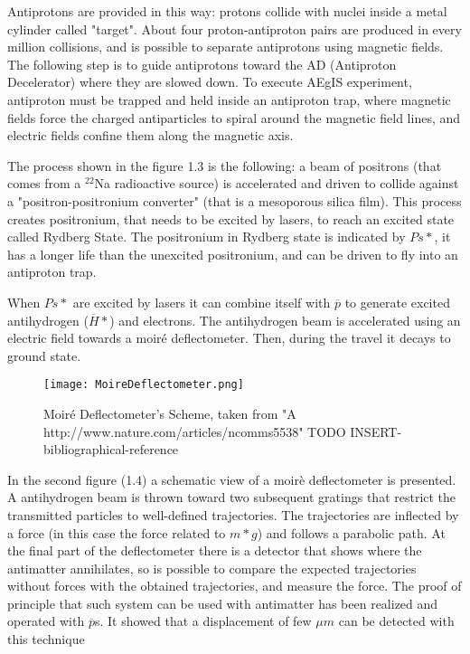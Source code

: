 Antiprotons are provided in this way:
protons collide with nuclei inside a metal cylinder called "target". About four proton-antiproton pairs are produced in every million collisions, and is possible to separate antiprotons using magnetic fields. The following step is to guide antiprotons toward the AD (Antiproton Decelerator) where they are slowed down. To execute AEgIS experiment, antiproton must be trapped and held inside an antiproton trap, where magnetic fields force the charged antiparticles to spiral around the magnetic field lines, and electric fields confine them along the magnetic axis.

The process shown in the figure 1.3 is the following: a beam of positrons (that comes from a $^{22}$Na radioactive source) is accelerated and driven to collide against a "positron-positronium converter" (that is a mesoporous silica film). This process creates positronium, that needs to be excited by lasers, to reach an excited state called Rydberg State. The positronium in Rydberg state is indicated by $ {Ps*} $, it has a longer life than the unexcited positronium, and can be driven to fly into an antiproton trap.


When $ {Ps*} $ are excited by lasers it can combine itself with $ \overline{p} $ to generate excited antihydrogen ($ \overline{H}* $) and electrons. The antihydrogen beam is accelerated using an electric field towards a moiré deflectometer. Then, during the travel it decays to ground state.  


\begin{figure}[H]
\centering
\texttt{[image: MoireDeflectometer.png]} 
\caption{Moiré Deflectometer's Scheme, taken from "A
http://www.nature.com/articles/ncomms5538" TODO INSERT-bibliographical-reference}
\end{figure}

In the second figure (1.4) a schematic view of a moirè deflectometer is presented.
A antihydrogen beam is thrown toward two subsequent gratings that restrict the transmitted particles to well-defined trajectories. The trajectories are inflected by a force (in this case the force related to $ {m*g} $) and follows a parabolic path. At the final part of the deflectometer there is a detector that shows where the antimatter annihilates, so is possible to compare the expected trajectories without forces with the obtained trajectories, and measure the force. The proof of principle that such system can be used with antimatter has been realized and operated with $ \overline{p} $s. It showed that a displacement of few $ \mu m $ can be detected with this technique %


